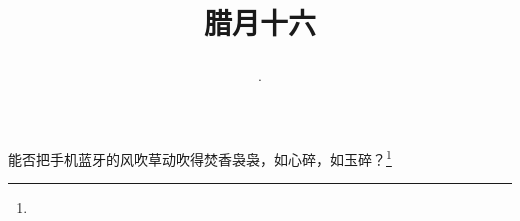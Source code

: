 \title{\date[d=26,m=1,y=2024][year:cn-y,年,month:cn,day:cn,日,·,weekday]·腊月十六 }
能否把手机蓝牙的风吹草动吹得焚香袅袅，如心碎，如玉碎？\footnote{ }

